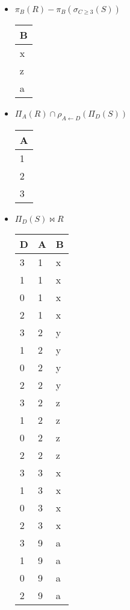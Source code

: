 \documentclass[12pt,a4paper]{article}
\begin{document}
\begin{enumerate}
\begin{itemize}
			\item $\pi_B (R) - \pi_B (\sigma_{C \geq 3} (S))$\\
				\begin{tabular}{|l|}
					\hline
					B\\
					\hline
					x\\
					z\\
					a\\
					\hline
				\end{tabular}

			\item $\Pi_A (R) \cap \rho_{A \leftarrow D} (\Pi_D (S))$\\
				\begin{tabular}{|l|}
					\hline
					A\\
					\hline
					1\\
					2\\
					3\\
					\hline
				\end{tabular}

			\pagebreak
			\item $\Pi_D (S) \bowtie R$\\
				\begin{tabular}{|l|l|l|}
					\hline
					D	&A	&B\\
					\hline
					3	&1	&x\\
					1	&1	&x\\
					0	&1	&x\\
					2	&1	&x\\
					\hline
					3	&2	&y\\
					1	&2	&y\\
					0	&2	&y\\
					2	&2	&y\\
					\hline
					3	&2	&z\\
					1	&2	&z\\
					0	&2	&z\\
					2	&2	&z\\
					\hline
					3	&3	&x\\
					1	&3	&x\\
					0	&3	&x\\
					2	&3	&x\\
					\hline
					3	&9	&a\\
					1	&9	&a\\
					0	&9	&a\\
					2	&9	&a\\
					\hline
				\end{tabular}


\end{itemize}
\end{enumerate}
\end{document}
